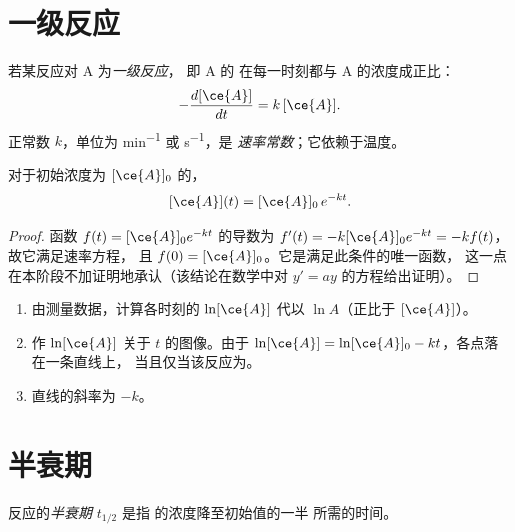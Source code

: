 \section{一级反应}

\begin{definition}\label{def:g12:reaction-rates:first-order}
若某反应对 A 为\emph{一级反应}，
即 A 的
在每一时刻都与 A 的浓度成正比：
\[
  -\frac{d[\ce{A}]}{dt} = k\,[\ce{A}] .
\]
正常数 $k$，单位为 \si{min^{-1}} 或 \si{s^{-1}}，是
\emph{速率常数}；它依赖于温度。
\end{definition}

\begin{proposition}[指数衰减]\label{prop:g12:reaction-rates:exponential}
对于初始浓度为 $[\ce{A}]_0$ 的，
\[
  [\ce{A}](t) = [\ce{A}]_0\, e^{-kt} .
\]
\end{proposition}

\begin{proof}
函数 $f(t) = [\ce{A}]_0 e^{-kt}$ 的导数为
$f'(t) = -k [\ce{A}]_0 e^{-kt} = -k f(t)$，故它满足速率方程，
且 $f(0) = [\ce{A}]_0$。它是满足此条件的唯一函数，
这一点在本阶段不加证明地承认（该结论在数学中对 $y' = ay$ 的方程给出证明）。
\end{proof}

\begin{method}[检验是否为一级反应]\label{met:g12:reaction-rates:test}
\begin{enumerate}
  \item 由测量数据，计算各时刻的 $\ln [\ce{A}]$
        代以 $\ln A$（正比于 $[\ce{A}]$）。
  \item 作 $\ln[\ce{A}]$ 关于 $t$ 的图像。由于
        $\ln[\ce{A}] = \ln[\ce{A}]_0 - kt$，各点落在一条直线上，
        当且仅当该反应为。
  \item 直线的斜率为 $-k$。
\end{enumerate}
\end{method}

\section{半衰期}

\begin{definition}[半衰期]\label{def:g12:reaction-rates:half-life}
反应的\emph{半衰期} $t_{1/2}$ 是指
的浓度降至初始值的一半
所需的时间。
\end{definition}

